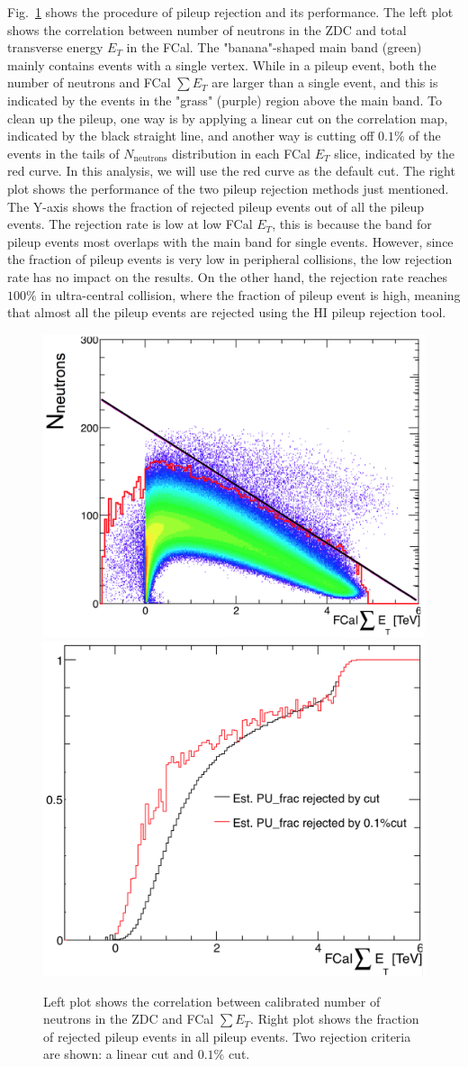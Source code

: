 Fig.~\ref{fig:evtSel_pu} shows the procedure of pileup rejection and its performance. The left plot shows the correlation between number of neutrons in the ZDC and total transverse energy $E_T$ in the FCal. The "banana"-shaped main band (green) mainly contains events with a single vertex. While in a pileup event, both the number of neutrons and FCal $\sum E_T$ are larger than a single event, and this is indicated by the events in the "grass" (purple) region above the main band. To clean up the pileup, one way is by applying a linear cut on the correlation map, indicated by the black straight line, and another way is cutting off $0.1\%$ of the events in the tails of $N_\text{neutrons}$ distribution in each FCal $E_{T}$ slice, indicated by the red curve. In this analysis, we will use the red curve as the default cut. The right plot shows the performance of the two pileup rejection methods just mentioned. The Y-axis shows the fraction of rejected pileup events out of all the pileup events. The rejection rate is low at low FCal $E_{T}$, this is because the band for pileup events most overlaps with the main band for single events. However, since the fraction of pileup events is very low in peripheral collisions, the low rejection rate has no impact on the results. On the other hand, the rejection rate reaches $100\%$ in ultra-central collision, where the fraction of pileup event is high, meaning that almost all the pileup events are rejected using the HI pileup rejection tool.
\begin{figure}[H]
\centering
\includegraphics[width=.45\linewidth]{figs/sec_evtSel/PbPb502/pu_corr.png}
\includegraphics[width=.45\linewidth]{figs/sec_evtSel/PbPb502/pu_perf.png}
\caption{Left plot shows the correlation between calibrated number of neutrons in the ZDC and FCal $\sum E_T$. Right plot shows the fraction of rejected pileup events in all pileup events. Two rejection criteria are shown: a linear cut and $0.1\%$ cut.}
\label{fig:evtSel_pu}
\end{figure}

